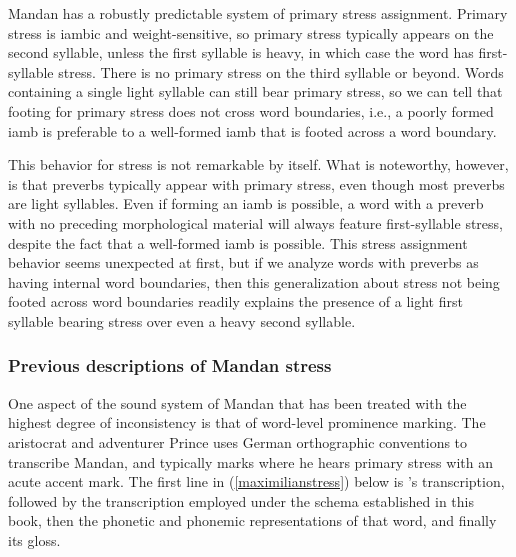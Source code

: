 Mandan has a robustly predictable system of primary stress assignment. Primary stress is iambic and weight-sensitive, so primary stress typically appears on the second syllable, unless the first syllable is heavy, in which case the word has first-syllable stress. There is no primary stress on the third syllable or beyond. Words containing a single light syllable can still bear primary stress, so we can tell that footing for primary stress does not cross word boundaries, i.e., a poorly formed iamb is preferable to a well-formed iamb that is footed across a word boundary.

This behavior for stress is not remarkable by itself. What is noteworthy, however, is that preverbs typically appear with primary stress, even though most preverbs are light syllables. Even if forming an iamb is possible, a word with a preverb with no preceding morphological material will always feature first-syllable stress, despite the fact that a well-formed iamb is possible. This stress assignment behavior seems unexpected at first, but if we analyze words with preverbs as having internal word boundaries, then this generalization about stress not being footed across word boundaries readily explains the presence of a light first syllable bearing stress over even a heavy second syllable.

\subsubsection{Previous descriptions of Mandan stress}\label{previousstress}

One aspect of the sound system of Mandan that has been treated with the highest degree of inconsistency is that of word-level prominence marking. The aristocrat and adventurer Prince \citet{maximilian1839} uses German orthographic conventions to transcribe Mandan, and typically marks where he hears primary stress with an acute accent mark. The first line in (\ref{maximilianstress}) below is \citeauthor{maximilian1839}'s transcription, followed by the transcription employed under the schema established in this book, then the phonetic and phonemic representations of that word, and finally its gloss.

